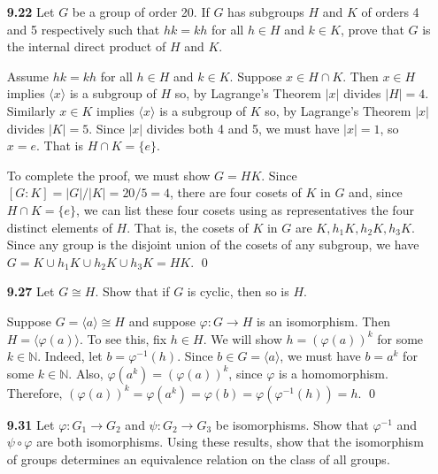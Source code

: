 \documentclass[12pt,reqno]{amsart}
\newcommand{\N}{\ensuremath{\mathbb{N}}}
\newcommand{\<}{\ensuremath{\langle}}
\renewcommand{\>}{\ensuremath{\rangle}}
\renewcommand{\phi}{\ensuremath{\varphi}}
\begin{document}
\begin{enumerate}[{\bf 1.}]

\newpage

\item[{\bf 9.22}]
Let $G$ be a group of order 20. If $G$ has subgroups $H$ and $K$ of
orders 4 and 5 respectively such that $hk = kh$ for all $h \in H$ and
$k \in K$, prove that $G$ is the internal direct product of $H$ and $K$. 

\medskip
{}  
Assume $hk = kh$ for all $h\in H$ and $k\in K$.
Suppose $x \in H\cap K$. Then $x \in H$ implies $\<x\>$ is a subgroup of $H$ so,
by Lagrange's Theorem $|x|$ divides $|H| = 4$.
Similarly $x \in K$ implies $\<x\>$ is a subgroup of $K$ so,
by Lagrange's Theorem $|x|$ divides $|K| = 5$. Since $|x|$ divides both 4 and 5,
we must have $|x| = 1$, so $x = e$.  That is $H\cap K = \{e\}$.

To complete the proof, we must show $G = HK$.
Since $[G : K] = |G|/|K| = 20/5 = 4$, there are four cosets of
$K$ in $G$ and, since $H\cap K = \{e\}$, we can list these four cosets
using as representatives the four distinct elements of $H$. That is,
the cosets of $K$ in $G$ are $K, h_1K, h_2K, h_3K$.  Since any group is
the disjoint union of the cosets of any subgroup, we have
$G = K \cup h_1K \cup h_2K \cup h_3K = HK$.
 \qed

\vskip1cm

\item[{\bf 9.27}]
Let $G \cong H$. Show that if $G$ is cyclic, then so is $H$.

\medskip
{} Suppose $G = \<a\> \cong H$ and suppose 
$\varphi: G \rightarrow H$ is an isomorphism.  Then 
$H = \<\varphi(a)\>$.  To see this, fix $h\in H$.  We will show 
$h = (\varphi(a))^k$ for some $k\in \N$. Indeed, let $b = \varphi^{-1}(h)$.
Since $b\in G = \<a\>$, we must have $b = a^k$ for some $k\in \N$.
Also, $\varphi(a^k) = (\varphi(a))^k$, since $\varphi$ is a homomorphism. 
Therefore, $(\varphi(a))^k = \varphi(a^k) = \varphi(b) = \varphi(\varphi^{-1}(h)) = h$.
\qed
\vskip1cm

\item[{\bf 9.31}]
Let $\phi : G_1 \rightarrow G_2$ and  $\psi : G_2 \rightarrow G_3$  be
isomorphisms. Show that  $\phi^{-1}$ and $\psi \circ \phi$ are both
isomorphisms. Using these results, show that the isomorphism of groups
determines an equivalence relation on the class of all groups.


\end{enumerate}
\end{document}
